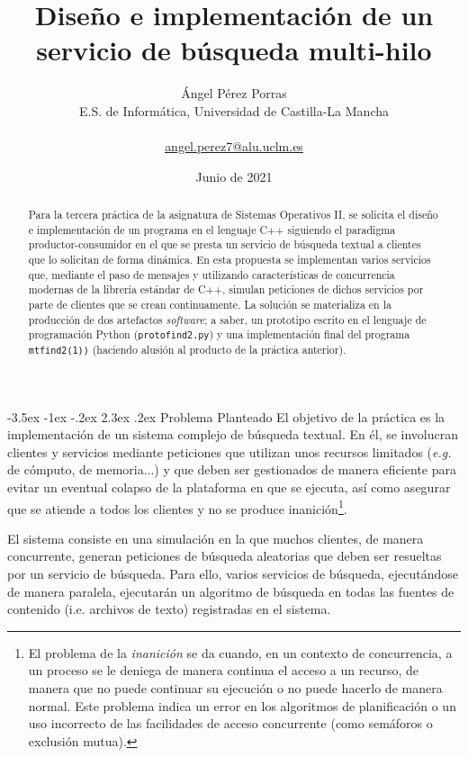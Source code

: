 \documentclass[a4paper]{article}
\title{
	\fontfamily{phv}\selectfont
	\textbf{Diseño e implementación de un servicio de búsqueda multi-hilo}
}
\author{
	\fontfamily{phv}\selectfont
	Ángel Pérez Porras \\
	\fontfamily{phv}\selectfont
	E.S. de Informática, Universidad de Castilla-La Mancha \\ \\
	\fontfamily{phv}\selectfont
	\hyperref{mailto:angel.perez7@alu.uclm.es}{}{}{angel.perez7@alu.uclm.es}
}
\date{\fontfamily{phv}\selectfont Junio de 2021}
\makeatletter
\renewcommand\section{\@startsection {section}{1}{\z@}%
	{-3.5ex \@plus -1ex \@minus -.2ex}%
	{2.3ex \@plus.2ex}%
	{\normalfont\large\scshape}}
\makeatother
\begin{document}
	\maketitle
	
	\begin{abstract}
		Para la tercera práctica de la asignatura de Sistemas Operativos II, se solicita el diseño e implementación de un programa en el lenguaje C++ siguiendo el paradigma productor-consumidor en el que se presta un servicio de búsqueda textual a clientes que lo solicitan de forma dinámica. En esta propuesta se implementan varios servicios que, mediante el paso de mensajes y utilizando características de concurrencia modernas de la librería estándar de C++, simulan peticiones de dichos servicios por parte de clientes que se crean continuamente. La solución se materializa en la producción de dos artefactos \textit{software}; a saber, un prototipo escrito en el lenguaje de programación Python (\texttt{protofind2.py}) y una implementación final del programa \texttt{mtfind2(1))} (haciendo alusión al producto de la práctica anterior).
	\end{abstract}
	
	
	\section{Problema Planteado}
	El objetivo de la práctica es la implementación de un sistema complejo de búsqueda textual. En él, se involucran clientes y servicios mediante peticiones que utilizan unos recursos limitados (\textit{e.g.} de cómputo, de memoria...) y que deben ser gestionados de manera eficiente para evitar un eventual colapso de la plataforma en que se ejecuta, así como asegurar que se atiende a todos los clientes y no se produce inanición\footnote{El problema de la \textit{inanición} se da cuando, en un contexto de concurrencia, a un proceso se le deniega de manera continua el acceso a un recurso, de manera que no puede continuar su ejecución o no puede hacerlo de manera normal. Este problema indica un error en los algoritmos de planificación o un uso incorrecto de las facilidades de acceso concurrente (como semáforos o exclusión mutua).}.
	
	El sistema consiste en una simulación en la que muchos clientes, de manera concurrente, generan peticiones de búsqueda aleatorias que deben ser resueltas por un servicio de búsqueda. Para ello, varios servicios de búsqueda, ejecutándose de manera paralela, ejecutarán un algoritmo de búsqueda en todas las fuentes de contenido (i.e. archivos de texto) registradas en el sistema.
	
\end{document}
